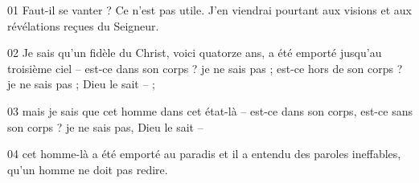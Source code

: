 01 Faut-il se vanter ? Ce n’est pas utile. J’en viendrai pourtant aux visions et aux révélations reçues du Seigneur.

02 Je sais qu’un fidèle du Christ, voici quatorze ans, a été emporté jusqu’au troisième ciel – est-ce dans son corps ? je ne sais pas ; est-ce hors de son corps ? je ne sais pas ; Dieu le sait – ;

03 mais je sais que cet homme dans cet état-là – est-ce dans son corps, est-ce sans son corps ? je ne sais pas, Dieu le sait –

04 cet homme-là a été emporté au paradis et il a entendu des paroles ineffables, qu’un homme ne doit pas redire.
